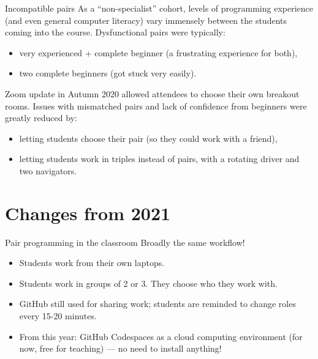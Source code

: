 \documentclass[aspectratio=169, 12pt]{beamer}
\begin{document}
\begin{frame}{Incompatible pairs}
    As a ``non-specialist'' cohort, levels of programming experience (and even general computer literacy) vary immensely between the students coming into the course. Dysfunctional pairs were typically:
    \begin{itemize}
        \item very experienced + complete beginner (a frustrating experience for both),
        \item two complete beginners (got stuck very easily).
    \end{itemize}
    \pause

    Zoom update in Autumn 2020 allowed attendees to choose their own breakout rooms. Issues with mismatched pairs and lack of confidence from beginners were greatly reduced by:
    \begin{itemize}
        \item letting students choose their pair (so they could work with a friend),
        \item letting students work in triples instead of pairs, with a rotating driver and two navigators.
    \end{itemize}
\end{frame}


\section{Changes from 2021}
\begin{frame}{Pair programming in the classroom}
    Broadly the same workflow!
    \begin{itemize}
        \item Students work from their own laptops.
        \item Students work in groups of 2 or 3. They choose who they work with.
        \item GitHub still used for sharing work; students are reminded to change roles every 15-20 minutes.
        \item From this year: GitHub Codespaces as a cloud computing environment (for now, free for teaching) --- no need to install anything!
    \end{itemize}
\end{frame}
\end{document}
